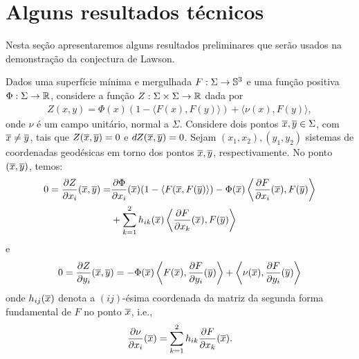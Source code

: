 \section{Alguns resultados técnicos}

Nesta se\c c\~ao apresentaremos alguns resultados preliminares
que ser\~ao usados na demonstra\c c\~ao da conjectura de
Lawson. 

\vspace{.2cm}

Dados uma superfície mínima e mergulhada $F:\Sigma\to\mathbb{S}^3$ 
e uma função positiva $\Phi: \Sigma\to\mathbb R$, considere a função 
$Z:\Sigma\times\Sigma\to\mathbb R$ dada por
\begin{eqnarray}\label{eq:funcaoZ}
Z(x,y) = \Phi(x) (1 - \langle F(x), F(y) \rangle) + \langle \nu(x), F(y) \rangle,
\end{eqnarray}
onde $\nu$ \'e um campo unitário, normal a $\Sigma$. Considere dois 
pontos $\overline{x}, \overline{y} \in \Sigma$, com $\overline{x} \neq \overline{y}$, tais que $Z(\overline{x}, \overline{y}) = 0$ e $dZ(\overline{x}, \overline{y}) = 0$. Sejam $(x_1,x_2), (y_1,y_2)$ sistemas de coordenadas geodésicas em torno dos pontos $\overline{x}, \overline{y}$, respectivamente. No ponto $(\overline{x},\overline{y})$, temos:
\begin{eqnarray}\label{diff_Z_x}
\begin{aligned}
0 = \frac{\partial Z}{\partial x_i} (\overline{x}, \overline{y}) = &
\frac{\partial \Phi}{\partial x_i}(\overline{x}) (1 - \langle F(\overline{x}, F(\overline{y}) \rangle) -  
\Phi(\overline{x}) \left\langle \frac{\partial F}{\partial x_i}(\overline{x}), F(\overline{y}) \right\rangle \\ & + \sum_{k=1}^{2} h_{ik}(\overline{x}) \left\langle \frac{\partial F}{\partial x_k}(\overline{x}), F(\overline{y}) \right\rangle
\end{aligned}
\end{eqnarray}
e
\begin{equation}\label{diff_Z_y}
0 = \frac{\partial Z}{\partial y_i} (\overline{x}, \overline{y}) = - \Phi(\overline{x}) \left\langle F(\overline{x}), \frac{\partial F}{\partial y_i} (\overline{y}) \right\rangle + \left\langle \nu(\overline{x}), \frac{\partial F}{\partial y_i}(\overline{y}) \right\rangle
\end{equation}
onde $h_{ij}(\overline{x})$ denota a $(ij)$-ésima coordenada da matriz da segunda forma fundamental de $F$ no ponto $\overline{x}$, i.e.,
\begin{eqnarray}\label{eq:partialNu}
\frac{\partial\nu}{\partial x_i}(\overline{x}) = 
\sum_{k=1}^2h_{ik}\frac{\partial F}{\partial x_k}(\overline{x}).
\end{eqnarray}

